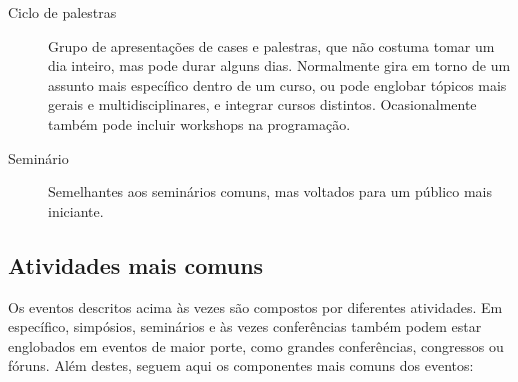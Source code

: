 \documentclass[12pt,a4paper,twoside,hyphens,english,brazil]{abntex2}
\begin{document}
\begin{description}
	\item[Ciclo de palestras] Grupo de apresentações de cases e palestras, que não costuma tomar um dia inteiro, mas pode durar alguns dias. Normalmente gira em torno de um assunto mais específico dentro de um curso, ou pode englobar tópicos mais gerais e multidisciplinares, e integrar cursos distintos. Ocasionalmente também pode incluir workshops na programação.
		
	\item[Seminário] Semelhantes aos seminários comuns, mas voltados para um público mais iniciante.
\end{description}

\subsection{Atividades mais comuns}
Os eventos descritos acima às vezes são compostos por diferentes atividades. Em específico, simpósios, seminários e \`as vezes conferências também podem estar englobados em eventos de maior porte, como grandes conferências, congressos ou fóruns. Além destes, seguem aqui os componentes mais comuns dos eventos:
\end{document}
